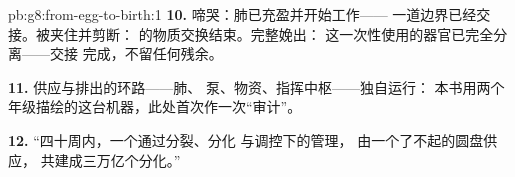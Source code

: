 \begin{solution}{pb:g8:from-egg-to-birth:1}
\textbf{10.} 啼哭：肺已充盈并开始工作——
一道边界已经交接。被夹住并剪断：
的物质交换结束。完整娩出：
这一次性使用的器官已完全分离——交接
完成，不留任何残余。

\textbf{11.} 供应与排出的环路——肺、
泵、物资、指挥中枢——独自运行：
本书用两个年级描绘的这台机器，此处首次作一次“审计”。

\textbf{12.} “四十周内，一个通过分裂、分化
与调控下的管理，
由一个了不起的圆盘供应，
共建成三万亿个分化。”
\end{solution}
